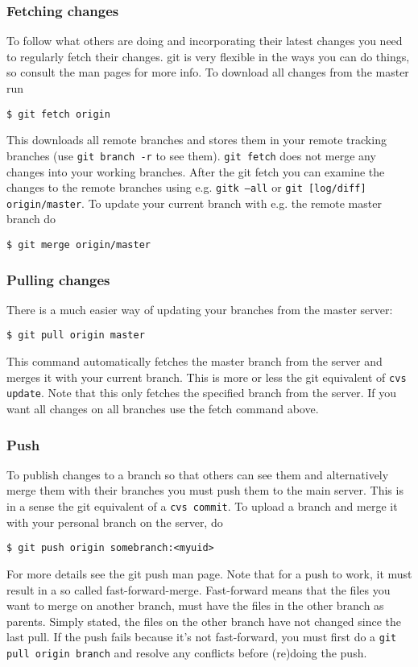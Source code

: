 \documentclass[a4paper,10pt]{article}
\begin{document}
\subsubsection{Fetching changes} 
To follow what others are doing and incorporating
their latest changes you need to regularly fetch their changes. git is very
flexible in the ways you can do things, so consult the man pages for more
info. To download all changes from the master run
\begin{verbatim}
$ git fetch origin 
\end{verbatim}
This downloads all remote branches and stores them in your remote tracking
branches (use {\tt git branch -r} to see them). {\tt git fetch} does not merge any changes
into your working branches. After the git fetch you can examine the changes to
the remote branches using e.g. {\tt gitk --all} or 
{\tt git [log/diff] origin/master}.
To update your current branch with e.g. the remote master branch do
\begin{verbatim}
$ git merge origin/master
\end{verbatim}

\subsubsection{Pulling changes} 
There is a much easier way of updating your branches
from the master server:
\begin{verbatim}
$ git pull origin master
\end{verbatim}
This command automatically fetches the master branch from the server and
merges it with your current branch. This is more or less the git equivalent of
{\tt cvs update}. Note that this only fetches the specified branch from the
server. If you want all changes on all branches use the fetch command above.

\subsubsection{Push} 
To publish changes to a branch so that others can see them and
alternatively merge them with their branches you must push them to the main
server. This is in a sense the git equivalent of a {\tt cvs commit}. 
To upload a
branch and merge it with your personal branch on the server, do
\begin{verbatim}
$ git push origin somebranch:<myuid>
\end{verbatim}
For more details see the git push man page. Note that for a push to work, it
must result in a so called fast-forward-merge. Fast-forward means that the
files you want to merge on another branch, must have the files in the other
branch as parents. Simply stated, the files on the other branch have not
changed since the last pull.  If the push fails because it's not fast-forward,
you must first do a {\tt git pull origin branch} and resolve any conflicts 
before
(re)doing the push.
\end{document}
